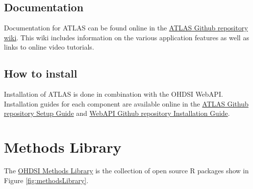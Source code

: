 \documentclass[11pt]{book}
\theoremstyle{definition}
\theoremstyle{definition}
\theoremstyle{definition}
\theoremstyle{remark}
\begin{document}
\hypertarget{documentation}{%
\subsection{Documentation}\label{documentation}}

Documentation for ATLAS can be found online in the \href{https://github.com/OHDSI/ATLAS/wiki}{ATLAS Github repository wiki}. This wiki includes information on the various application features as well as links to online video tutorials.

\hypertarget{how-to-install}{%
\subsection{How to install}\label{how-to-install}}

Installation of ATLAS is done in combination with the OHDSI WebAPI. Installation guides for each component are available online in the \href{https://github.com/OHDSI/Atlas/wiki/Atlas-Setup-Guide}{ATLAS Github repository Setup Guide} and \href{https://github.com/OHDSI/WebAPI/wiki/WebAPI-Installation-Guide}{WebAPI Github repository Installation Guide}.

\hypertarget{methods-library}{%
\section{Methods Library}\label{methods-library}}

The \href{https://ohdsi.github.io/MethodsLibrary/}{OHDSI Methods Library} is the collection of open source R packages show in Figure \ref{fig:methodsLibrary}.
\end{document}
